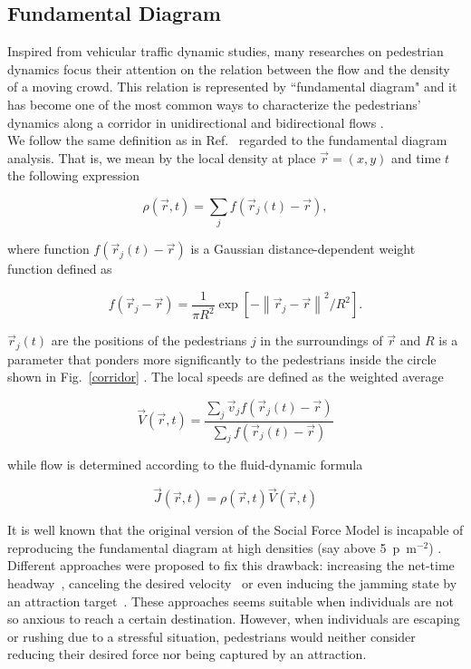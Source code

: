 \documentclass[preprint,12pt]{elsarticle}
\begin{document}
\subsection{\label{fundamental-diagram} Fundamental Diagram}

Inspired from vehicular traffic dynamic studies, many researches on pedestrian 
dynamics focus their attention on the relation between the flow and the density 
of a moving crowd. This relation is represented by ``fundamental diagram" and it 
has become one of the most common ways to characterize the pedestrians' dynamics 
along a corridor in unidirectional and bidirectional flows 
\cite{seyfried1,fruin1,mori1,polus1,jelic1}. \\

We follow the same definition as in Ref.~\cite{helbing3} regarded to the fundamental diagram analysis. That is, we mean by the local density at place $\vec{r}=(x,y)$ and time $t$ the following expression

\begin{equation}
\rho(\vec{r},t)=\sum_{j}f(\vec{r}_j(t)-\vec{r}), \label{ec-density}
\end{equation}

where function $f(\vec{r}_j(t)-\vec{r})$ is a Gaussian distance-dependent weight function defined as

\begin{equation}
f(\vec{r}_j-\vec{r})=\frac{1}{\pi R^2}\exp[-\left \| \vec{r}_j-\vec{r} \right \|^2/R^2]. \label{ec-f}
\end{equation}

$\vec{r}_j(t)$ are the positions of the pedestrians $j$ in the surroundings of $\vec{r}$ and $R$ is a parameter that ponders more significantly to the pedestrians inside the circle shown in Fig.~\ref{corridor} . 
The local speeds are defined as the weighted average  

\begin{equation}
\vec{V}(\vec{r},t)=\frac{\sum_j \vec{v}_jf(\vec{r}_j(t)-\vec{r}) }{\sum_j f(\vec{r}_j(t)-\vec{r}) } \label{ec-v}
\end{equation}

while flow is determined according to the fluid-dynamic formula

\begin{equation}
\vec{J}(\vec{r},t)=\rho(\vec{r},t)\vec{V}(\vec{r},t) \label{ec-flow}
\end{equation}

It is well known that the original version of the Social Force 
Model  is incapable of reproducing the 
fundamental diagram at high densities (say above 
5~p~m$^{-2}$) \cite{parisi2} . Different 
approaches were proposed to fix this drawback: increasing the net-time 
headway~\cite{johansson}, canceling the desired velocity~\cite{parisi2} or even 
inducing the jamming state by an attraction target~\cite{kwak}. These approaches 
seems suitable when individuals are not so anxious to reach a certain 
destination. However, when individuals are escaping or rushing due to a 
stressful situation, pedestrians would neither consider reducing their desired 
force nor being captured by an attraction. \\
\end{document}
